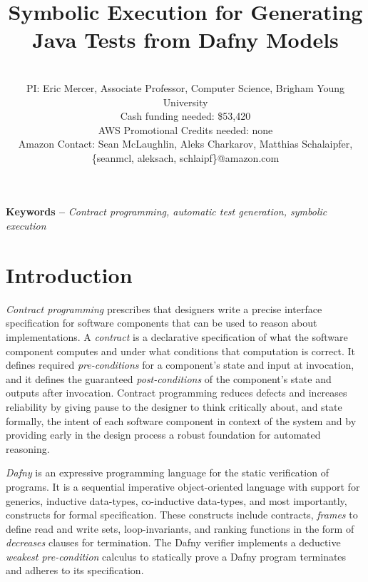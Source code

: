 \documentclass[11pt,onecolumn,notitlepage]{article}
\makeatletter
\renewcommand{\maketitle}{\bgroup\setlength{\parindent}{0pt}
\begin{flushleft}
  \Large{\textbf{\@title}}
  
  \normalsize{\@author}
\end{flushleft}\egroup
}
\makeatother
\begin{document}
\title{Symbolic Execution for Generating Java Tests from Dafny Models}
\author{\hfill \\
        PI: Eric Mercer, Associate Professor, Computer Science, Brigham Young University\\
        Cash funding needed: \$53,420 \\
        AWS Promotional Credits needed: none\\
        Amazon Contact: Sean McLaughlin, Aleks Charkarov, Matthias Schalaipfer, \{seanmcl, aleksach, schlaipf\}@amazon.com}

\maketitle



\providecommand{\keywords}[1]{\noindent\textbf{Keywords -- } \textit{#1}}
\keywords{Contract programming, automatic test generation, symbolic execution}

\section*{Introduction}
\emph{Contract programming} prescribes that designers write a precise interface specification for software components that can be used to reason about implementations. A \emph{contract} is a declarative specification of what the software component computes and under what conditions that computation is correct. It defines required \emph{pre-conditions} for a component's state and input at invocation, and it defines the guaranteed \emph{post-conditions} of the component's state and outputs after invocation. Contract programming reduces defects and increases reliability by giving pause to the designer to think critically about, and state formally, the intent of each software component in context of the system and by providing early in the design process a robust foundation for automated reasoning. 

\emph{Dafny} is an expressive programming language for the static verification of programs. It is a sequential imperative object-oriented language with support for generics, inductive data-types, co-inductive data-types, and most importantly, constructs for formal specification. These constructs include contracts, \emph{frames} to define read and write sets, loop-invariants, and ranking functions in the form of \emph{decreases} clauses for termination. The Dafny verifier implements a deductive \emph{weakest pre-condition} calculus to statically prove a Dafny program terminates and adheres to its specification.  
\end{document}
